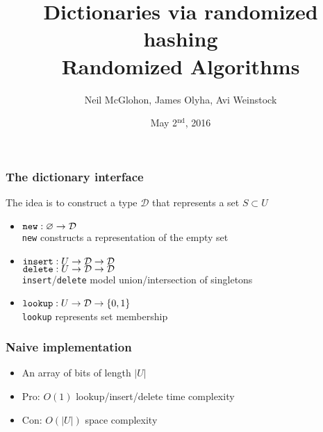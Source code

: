 \documentclass{beamer}
\title{Dictionaries via randomized hashing\\Randomized Algorithms}
\date{May 2$^\text{nd}$, 2016}
\author{Neil McGlohon, James Olyha, Avi Weinstock}
\let\emptyset\varnothing
\begin{document}
\maketitle

\begin{frame}[fragile]
\frametitle{The dictionary interface}
The idea is to construct a type $\mathcal D$ that represents a set $S \subset U$
\begin{itemize}
\item
$\verb|new| : \emptyset \rightarrow \mathcal D$\\
\verb|new| constructs a representation of the empty set
\item
$\verb|insert| : U \rightarrow \mathcal D \rightarrow \mathcal D$\\
$\verb|delete| : U \rightarrow \mathcal D \rightarrow \mathcal D$\\
\verb|insert|/\verb|delete| model union/intersection of singletons
\item
$\verb|lookup| : U \rightarrow \mathcal D \rightarrow \{0,1\}$\\
\verb|lookup| represents set membership
\end{itemize}
\end{frame}

\begin{frame}[fragile]
\frametitle{Naive implementation}
\begin{itemize}
\item
An array of bits of length $|U|$
\item
Pro: $O(1)$ lookup/insert/delete time complexity
\item
Con: $O(|U|)$ space complexity
\end{itemize}
\end{frame}
\end{document}
